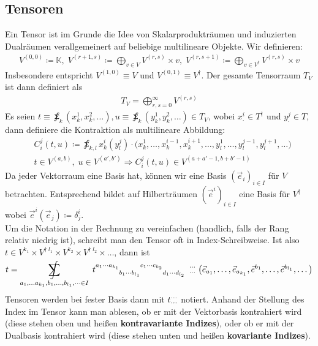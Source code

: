 \documentclass[12pt]{article}
\begin{document}
\subsection{Tensoren}
Ein Tensor ist im Grunde die Idee von Skalarprodukträumen und induzierten Dualräumen verallgemeinert auf beliebige multilineare Objekte. Wir definieren:
\begin{align}
V^{(0, 0)} \coloneqq \mathbb K,\;  V^{(r+1, s)} \coloneqq \bigoplus_{v\in V} V^{(r, s)} \times v,\; V^{(r, s+1)} \coloneqq \bigoplus_{v\in V^\dagger} V^{(r, s)} \times v
\end{align}
Insbesondere entspricht $V^{(1, 0)} \equiv V$ und $V^{(0, 1)} \equiv V^\dagger$. Der gesamte Tensorraum $T_V$ ist dann definiert als
\begin{align}
T_V = \bigoplus_{r,s = 0}^\infty V^{(r, s)}
\end{align}
Es seien $t\equiv \sumint_k (x^1_k, x^2_k, \dots), u\equiv \sumint_k (y^1_k, y^2_k, \dots) \in T_V$, wobei $x^i_\cdot \in T^\dagger$ und $y^j_\cdot \in T$, dann definiere die Kontraktion als multilineare Abbildung:
\begin{align}
&C_i^j(t, u) \coloneqq \sumint_{k, l} x^i_k(y^j_l) \cdot \big(x^1_k, \dots, x^{i-1}_k, x^{i+1}_k, \dots, y^1_l, \dots, y^{j-1}_l, y^{j+1}_l, \dots\big)\\
&t \in V^{(a, b)},\; u \in V^{(a', b')} \Rightarrow C_i^j(t, u) \in V^{(a+a'-1, b+b'-1)}
\end{align}
Da jeder Vektorraum eine Basis hat, können wir eine Basis $(\vec e_i)_{i\in I}$ für $V$ betrachten. Entsprechend bildet auf Hilberträumen $(\vec e^i)_{i\in I}$ eine Basis für $V^\dagger$ wobei $\vec e^i(\vec e_j) \coloneqq \delta^i_j$.\\
Um die Notation in der Rechnung zu vereinfachen (handlich, falls der Rang relativ niedrig ist), schreibt man den Tensor oft in Index-Schreibweise. Ist also $t \in V^{k_1} \times V^{\dagger\; l_1} \times V^{k_2} \times V^{\dagger\; l_2} \times \dots$, dann ist
\begin{align}
t = \sumint_{a_1,\dots a_{k_1}, b_1,\dots, b_{l_1}, \dots \in I} \; t\indices{^{a_1\cdots a_{k_1}} _{b_1\cdots b_{l_1}} ^{c_1\cdots c_{k_2}} _{d_1\cdots d_{l_2}}} \phantom{0} \indices*{^\cdots_\cdots} \; \big( \vec e_{a_1}, \dots, \vec e_{a_{k_1}}, \vec e^{b_1}, \dots, \vec e^{b_{l_1}}, \dots \big)
\end{align}
Tensoren werden bei fester Basis dann mit $t\indices*{^\cdots_\cdots}$ notiert. Anhand der Stellung des Index im Tensor kann man ablesen, ob er mit der Vektorbasis kontrahiert wird (diese stehen oben und heißen \textbf{kontravariante Indizes}), oder ob er mit der Dualbasis kontrahiert wird (diese stehen unten und heißen \textbf{kovariante Indizes}).\\
\end{document}
